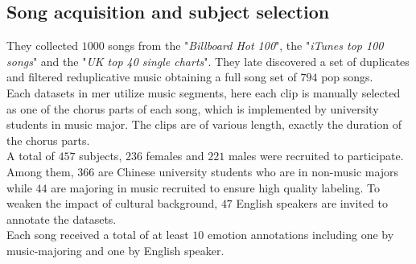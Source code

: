 \subsection{Song acquisition and subject selection}
They collected $1000$ songs from the "\textit{Billboard Hot 100}", the "\textit{iTunes top 100 songs}" and the "\textit{UK top 40 single charts}". They late discovered a set of duplicates and filtered reduplicative music obtaining a full song set of $794$ pop songs.
\\
Each datasets in \gls{mer} utilize music segments, here each clip is manually selected as one of the chorus parts of each song, which is implemented by university students in music major. The clips are of various length, exactly the duration of the chorus parts.
\\ \indent
A total of $457$ subjects, $236$ females and $221$ males were recruited to participate. Among them, $366$ are Chinese university students who are in non-music majors while $44$ are majoring in music recruited to ensure high quality labeling. To weaken the impact of cultural background, $47$ English speakers are invited to annotate the datasets.
\\
Each song received a total of at least $10$ emotion annotations including one by music-majoring and one by English speaker.

